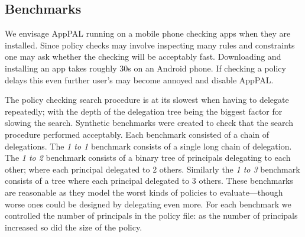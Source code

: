 \documentclass[]{llncs}
\begin{document}
%
%

\subsection{Benchmarks}
\label{ssec:benchmarks}

We envisage AppPAL running on a mobile phone checking apps when they are installed.
Since policy checks may involve inspecting many rules and constraints one may ask whether the checking will be acceptably fast.
Downloading and installing an app takes roughly 30s on an Android phone.
If checking a policy delays this even further user's may become annoyed and disable AppPAL.

The policy checking search procedure is at its slowest when having to delegate repeatedly;
  with the depth of the delegation tree being the biggest factor for slowing the search.
Synthetic benchmarks were created to check that the search procedure performed acceptably.
Each benchmark consisted of a chain of delegations.
The \emph{1 to 1} benchmark consists of a single long chain of delegation.
The \emph{1 to 2} benchmark consists of a binary tree of principals delegating to each other; where each principal delegated to 2 others.
Similarly the \emph{1 to 3} benchmark consists of a tree where each principal delegated to 3 others.
These benchmarks are reasonable as they model the worst kinds of policies to evaluate---though worse ones could be designed by delegating even more.
For each benchmark we controlled the number of principals in the policy file:
  as the number of principals increased so did the size of the policy.
\end{document}

